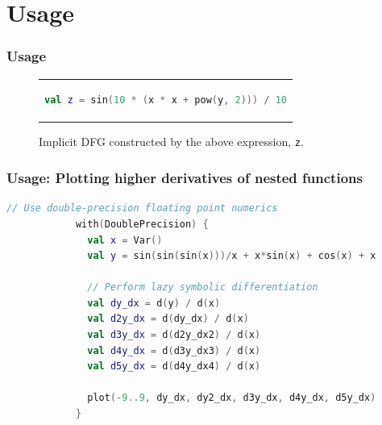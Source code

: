 \documentclass{beamer}
\begin{document}
    \section{Usage}

    \begin{frame}[fragile]
        \frametitle{Usage}
            \squeezeup\begin{figure}[!htb]
                  \begin{center}
                  \begin{tabular}{c}
                  \begin{lstlisting}[language=Kotlin, gobble=22]
                      val z = sin(10 * (x * x + pow(y, 2))) / 10
                  \end{lstlisting}
                  \end{tabular}
                  \end{center}
                  \vspace{10}
                  \squeezeup\centering
                  \squeezeup\squeezeup\squeezeup\caption{Implicit DFG constructed by the above expression, \texttt{z}.}
    \end{figure}
    \end{frame}

    \begin{frame}[fragile]
        \frametitle{Usage: Plotting higher derivatives of nested functions}
        \begin{lstlisting}[language=Kotlin, gobble=12]
            // Use double-precision floating point numerics
            with(DoublePrecision) {
              val x = Var()
              val y = sin(sin(sin(x)))/x + x*sin(x) + cos(x) + x

              // Perform lazy symbolic differentiation
              val dy_dx = d(y) / d(x)
              val d2y_dx = d(dy_dx) / d(x)
              val d3y_dx = d(d2y_dx2) / d(x)
              val d4y_dx = d(d3y_dx3) / d(x)
              val d5y_dx = d(d4y_dx4) / d(x)

              plot(-9..9, dy_dx, dy2_dx, d3y_dx, d4y_dx, d5y_dx)
            }
        \end{lstlisting}
    \end{frame}
\end{document}
